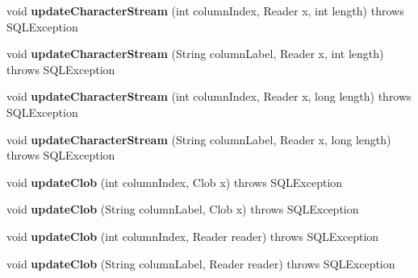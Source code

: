 \begin{DoxyCompactItemize}
void {\bfseries update\+Character\+Stream} (int column\+Index, Reader x, int length)  throws S\+Q\+L\+Exception 
\item 
\mbox{\label{classsimpledb_1_1jdbc_1_1ResultSetAdapter_a3cdcfd64cef3707a6967ade71053795e}} 
void {\bfseries update\+Character\+Stream} (String column\+Label, Reader x, int length)  throws S\+Q\+L\+Exception 
\item 
\mbox{\label{classsimpledb_1_1jdbc_1_1ResultSetAdapter_af46e8903b728e19be3363de44a2e9d5a}} 
void {\bfseries update\+Character\+Stream} (int column\+Index, Reader x, long length)  throws S\+Q\+L\+Exception 
\item 
\mbox{\label{classsimpledb_1_1jdbc_1_1ResultSetAdapter_ad82cf096b771d6cd85fa63953bcc026a}} 
void {\bfseries update\+Character\+Stream} (String column\+Label, Reader x, long length)  throws S\+Q\+L\+Exception 
\item 
\mbox{\label{classsimpledb_1_1jdbc_1_1ResultSetAdapter_a5b0bff296e4a19bda62f6beaed921a61}} 
void {\bfseries update\+Clob} (int column\+Index, Clob x)  throws S\+Q\+L\+Exception 
\item 
\mbox{\label{classsimpledb_1_1jdbc_1_1ResultSetAdapter_a78769f40d5f767ed6db613828941dbd4}} 
void {\bfseries update\+Clob} (String column\+Label, Clob x)  throws S\+Q\+L\+Exception 
\item 
\mbox{\label{classsimpledb_1_1jdbc_1_1ResultSetAdapter_a51bdd16bb2b6add6ee8313d7f91377aa}} 
void {\bfseries update\+Clob} (int column\+Index, Reader reader)  throws S\+Q\+L\+Exception 
\item 
\mbox{\label{classsimpledb_1_1jdbc_1_1ResultSetAdapter_a381d0a732f5474a2e4ff5b17c532a3b7}} 
void {\bfseries update\+Clob} (String column\+Label, Reader reader)  throws S\+Q\+L\+Exception 
\item 
\mbox{\label{classsimpledb_1_1jdbc_1_1ResultSetAdapter_accf5b0644f50da6d8d6ce6a79fc6a12a}} 

\end{DoxyCompactItemize}
